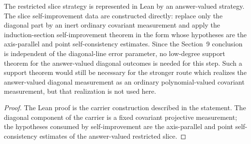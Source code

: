 \begin{proposition}\label{prop:main-induction-successor-answer-slice-realization}
	\leanok
	The restricted slice strategy is represented in Lean by an answer-valued
	strategy.  The slice self-improvement data are constructed directly: replace
	only the diagonal part by an inert ordinary covariant measurement and apply
	the induction-section self-improvement theorem in the form whose hypotheses
	are the axis-parallel and point self-consistency estimates.  Since the
	Section~9 conclusion is independent of the diagonal-line error parameter,
	no low-degree support theorem for the answer-valued diagonal outcomes is
	needed for this step.  Such a support theorem would still be necessary for
	the stronger route which realizes the answer-valued diagonal measurement as
	an ordinary polynomial-valued covariant measurement, but that realization is
	not used here.
\end{proposition}
\begin{proof}
	\leanok
	The Lean proof is the carrier construction described in the statement.  The
	diagonal component of the carrier is a fixed covariant projective
	measurement; the hypotheses consumed by self-improvement are the
	axis-parallel and point self-consistency estimates of the answer-valued
	restricted slice.
\end{proof}

